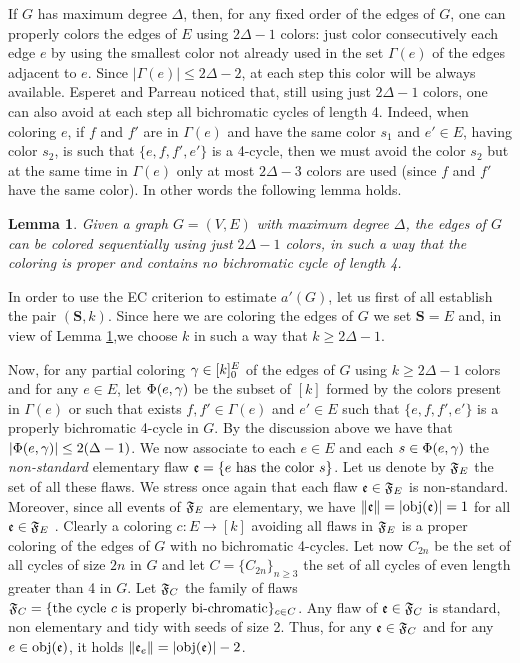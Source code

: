 \documentclass[11pt]{article}
\newtheorem{lem}[theo]{Lemma}
\let\D=\Delta \let\F=\Phi \let\G=\Gamma \let\L=\Lambda \let\Th=\Theta
\let\\=\noindent
\begin{document}
\noindent If $G$ has maximum degree $\D$, then, for any fixed order  of the edges of $G$, one can properly colors the edges of $E$
using $2\D-1$ colors: just color consecutively
each edge $e$ by using the smallest color not already used in the set $\G(e)$ of the edges adjacent to $e$. Since
$|\G(e)|\le 2\D-2$, at each step this color will be always available. Esperet and Parreau \cite{EP} noticed
that, still using just $2\D-1$ colors, one can also avoid  at each step
all bichromatic cycles of length 4. Indeed, when coloring $e$, if $f$ and $f'$ are in $\G(e)$ and have the same
color $s_1$ and $e'\in E$, having color $s_2$, is  such that
$\{e,f,f',e'\}$ is a 4-cycle, then we must avoid the color $s_2$ but at the same time in $\G(e)$ only at most $2\D-3$ colors
are used (since $f$ and $f'$  have the same color). In other words the following lemma holds.

\begin{lem}\label{4cy} Given a graph $G=(V,E)$ with maximum degree $\D$, the edges of $G$ can be colored sequentially
using just $2\D-1$ colors, in such a way that
the coloring is proper and  contains no  bichromatic cycle of length 4.
\end{lem}

\\In order  to use the EC criterion to  estimate $a'(G)$, let us first of all establish the pair $(\mathbf{S},k)$.
Since here we are coloring the edges of $G$ we set $\mathbf{S}=E$ and, in view of Lemma \ref{4cy},we choose  $k$ in such a way that
$k\ge 2\D-1$.

\\Now, for any partial coloring $\gamma\in [k]_0^E$ of the edges of $G$ using $k\ge 2\D-1$ colors
and for any $e\in E$, let $\F(e,\g)$ be the subset of $[k]$ formed by the colors  present in $\G(e)$  or such that
exists $f,f'\in \G(e)$  and $e'\in E$ such that
$\{e,f,f',e'\}$ is a properly bichromatic 4-cycle in $G$.  By the discussion above we have that $|\F(e,\g)|\le 2(\D-1)$.
We now  associate  to each $e\in E$  and each $s\in  \F(e,\g)$  the {\it non-standard} elementary flaw ${\mathfrak{e}}=\{\mbox{$e$ has the color $s$}\}$.
Let us denote by ${\mathfrak{F}}_E$ the set of
all these flaws. We stress once again that each flaw  ${\mathfrak{e}}\in{\mathfrak{F}}_E$ is non-standard. Moreover, since all events
of ${\mathfrak{F}}_E$ are elementary, we have  $\|{\mathfrak{e}}\|=|{\rm obj}({\mathfrak{e}})|=1$ for all ${\mathfrak{e}}\in{\mathfrak{F}}_E$ . Clearly a coloring $c: E\to [k]$  avoiding all   flaws in ${\mathfrak{F}}_E$
is a proper coloring of the edges of $G$ with no bichromatic 4-cycles.
Let now $C_{2n}$ be the set of all cycles of size $2n$ in $G$ and let $C=\{C_{2n}\}_{n\ge 3}$ the set of all cycles of even length greater than 4 in $G$. Let ${\mathfrak{F}}_C$
the family of flaws  ${\mathfrak{F}}_C=\{\mbox{the cycle $c$ is properly bi-chromatic}\}_{c\in C}$. Any flaw of ${\mathfrak{e}}\in {\mathfrak{F}}_C$ is standard,
non elementary and  tidy with seeds of size 2. Thus, for any ${\mathfrak{e}}\in {\mathfrak{F}}_C$ and
 for any $e\in {\rm obj}({\mathfrak{e}})$,  it holds  $\|{\mathfrak{e}}_e\|=|{\rm obj}({\mathfrak{e}})|-{2}$.
\end{document}
